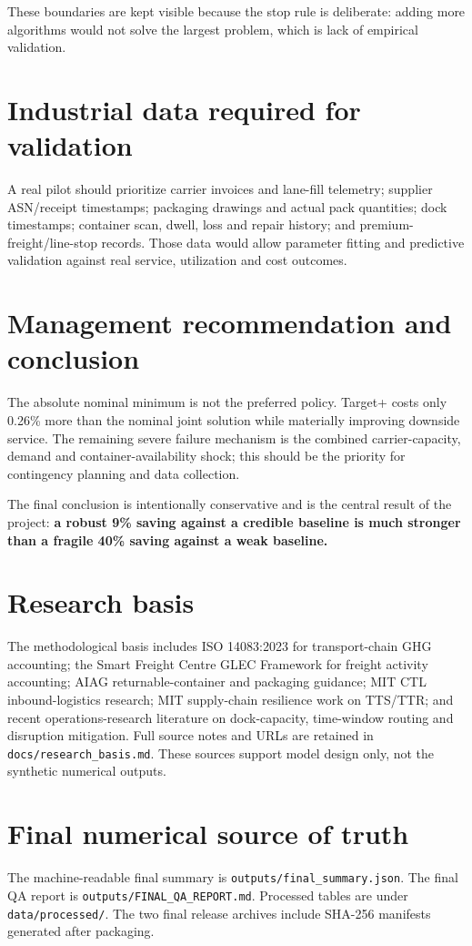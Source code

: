 \documentclass[11pt]{article}
\begin{document}
These boundaries are kept visible because the stop rule is deliberate: adding more algorithms would not solve the largest problem, which is lack of empirical validation.

\section{Industrial data required for validation}
A real pilot should prioritize carrier invoices and lane-fill telemetry; supplier ASN/receipt timestamps; packaging drawings and actual pack quantities; dock timestamps; container scan, dwell, loss and repair history; and premium-freight/line-stop records. Those data would allow parameter fitting and predictive validation against real service, utilization and cost outcomes.

\section{Management recommendation and conclusion}
The absolute nominal minimum is not the preferred policy. Target+ costs only 0.26\% more than the nominal joint solution while materially improving downside service. The remaining severe failure mechanism is the combined carrier-capacity, demand and container-availability shock; this should be the priority for contingency planning and data collection.

The final conclusion is intentionally conservative and is the central result of the project: \textbf{a robust 9\% saving against a credible baseline is much stronger than a fragile 40\% saving against a weak baseline.}

\appendix
\section{Research basis}
The methodological basis includes ISO 14083:2023 for transport-chain GHG accounting; the Smart Freight Centre GLEC Framework for freight activity accounting; AIAG returnable-container and packaging guidance; MIT CTL inbound-logistics research; MIT supply-chain resilience work on TTS/TTR; and recent operations-research literature on dock-capacity, time-window routing and disruption mitigation. Full source notes and URLs are retained in \texttt{docs/research\_basis.md}. These sources support model design only, not the synthetic numerical outputs.

\section{Final numerical source of truth}
The machine-readable final summary is \texttt{outputs/final\_summary.json}. The final QA report is \texttt{outputs/FINAL\_QA\_REPORT.md}. Processed tables are under \texttt{data/processed/}. The two final release archives include SHA-256 manifests generated after packaging.
\end{document}
